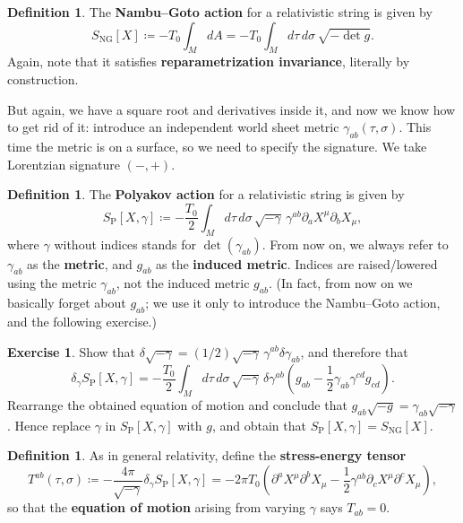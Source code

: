 \documentclass{report}
\theoremstyle{plain}
\theoremstyle{definition}
\newtheorem{definition}[theorem]{Definition}
\newtheorem{exercise}{Exercise}[section]
\theoremstyle{remark}
\newcommand{\di}{\partial}
\begin{document}
\begin{definition}
  The {\bf Nambu--Goto action} for a relativistic string is given by
  \[ S_{\text{NG}}[X] \coloneqq -T_0 \int_M dA = -T_0 \int_M d\tau \, d\sigma \, \sqrt{-\det g}. \]
  Again, note that it satisfies {\bf reparametrization invariance},
  literally by construction.
\end{definition}

But again, we have a square root and derivatives inside it, and now we
know how to get rid of it: introduce an independent world sheet metric
$\gamma_{ab}(\tau, \sigma)$. This time the metric is on a surface, so
we need to specify the signature. We take Lorentzian signature $(-,
+)$.

\begin{definition}
  The {\bf Polyakov action} for a relativistic string is given by
  \[ S_{\text{P}}[X, \gamma] \coloneqq -\frac{T_0}{2} \int_M d\tau \, d\sigma \, \sqrt{-\gamma} \, \gamma^{ab} \di_a X^\mu \di_b X_\mu, \]
  where $\gamma$ without indices stands for $\det(\gamma_{ab})$. From
  now on, we always refer to $\gamma_{ab}$ as the {\bf metric}, and
  $g_{ab}$ as the {\bf induced metric}. Indices are raised/lowered
  using the metric $\gamma_{ab}$, not the induced metric $g_{ab}$. (In
  fact, from now on we basically forget about $g_{ab}$; we use it only
  to introduce the Nambu--Goto action, and the following exercise.)
\end{definition}

\begin{exercise}
  Show that $\delta \sqrt{-\gamma} = (1/2)\sqrt{-\gamma} \,
  \gamma^{ab} \delta \gamma_{ab}$, and therefore that
  \[ \delta_\gamma S_{\text{P}}[X, \gamma] = -\frac{T_0}{2} \int_M d\tau \, d\sigma \, \sqrt{-\gamma} \, \delta \gamma^{ab} \left(g_{ab} - \frac{1}{2} \gamma_{ab} \gamma^{cd} g_{cd}\right). \]
  Rearrange the obtained equation of motion and conclude that
  $g_{ab}\sqrt{-g} = \gamma_{ab}\sqrt{-\gamma}$. Hence replace
  $\gamma$ in $S_{\text{P}}[X, \gamma]$ with $g$, and obtain that
  $S_{\text{P}}[X, \gamma] = S_{\text{NG}}[X]$.
\end{exercise}

\begin{definition}
  As in general relativity, define the {\bf stress-energy tensor}
  \[ T^{ab}(\tau, \sigma) \coloneqq -\frac{4\pi}{\sqrt{-\gamma}} \delta_{\gamma} S_{\text{P}}[X, \gamma] = -2\pi T_0 \left(\di^a X^\mu \di^b X_\mu - \frac{1}{2} \gamma^{ab} \di_c X^\mu \di^c X_\mu\right), \]
  so that the {\bf equation of motion} arising from varying $\gamma$
  says $T_{ab} = 0$.
\end{definition}
\end{document}
